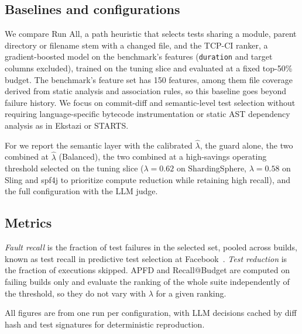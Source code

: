 

\subsection{Baselines and configurations}

We compare Run All, a path heuristic that selects tests sharing a module, parent directory or filename stem with a changed file, and the TCP-CI ranker, a gradient-boosted model on the benchmark's features (\texttt{duration} and target columns excluded), trained on the tuning slice and evaluated at a fixed top-50\% budget. The benchmark's feature set has 150 features, among them file coverage derived from static analysis and association rules, so this baseline goes beyond failure history. We focus on commit-diff and semantic-level test selection without requiring language-specific bytecode instrumentation or static AST dependency analysis as in Ekstazi or STARTS.

For \tool{} we report the semantic layer with the calibrated $\hat\lambda$, the guard alone, the two combined at $\hat\lambda$ (Balanced), the two combined at a high-savings operating threshold selected on the tuning slice ($\lambda = 0.62$ on ShardingSphere, $\lambda = 0.58$ on Sling and spf4j to prioritize compute reduction while retaining high recall), and the full configuration with the LLM judge.

\subsection{Metrics}

\textit{Fault recall} is the fraction of test failures in the selected set, pooled across builds, known as test recall in predictive test selection at Facebook~\cite{machalica2019predictive}. \textit{Test reduction} is the fraction of executions skipped. APFD and Recall@Budget are computed on failing builds only and evaluate the ranking of the whole suite independently of the threshold, so they do not vary with $\lambda$ for a given ranking.

All figures are from one run per configuration, with LLM decisions cached by diff hash and test signatures for deterministic reproduction.
